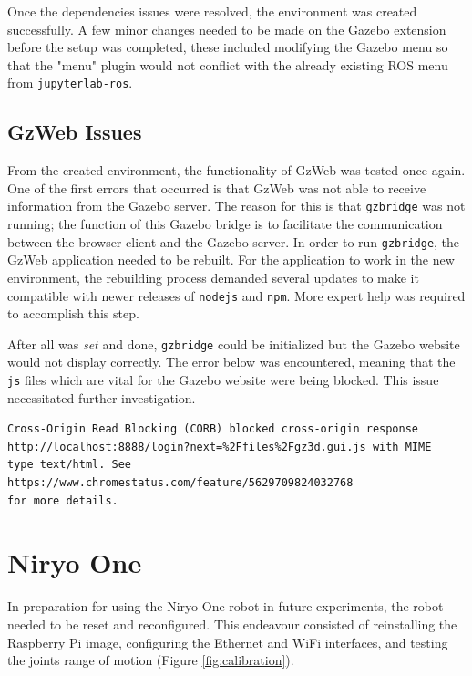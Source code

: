     Once the dependencies issues were resolved, the environment was created successfully. A few minor changes needed to be made on the Gazebo extension before the setup was completed, these included modifying the Gazebo menu so that the "menu" plugin would not conflict with the already existing ROS menu from \texttt{jupyterlab-ros}.
    
    \subsection{GzWeb Issues}
    
    From the created environment, the functionality of GzWeb was tested once again. One of the first errors that occurred is that GzWeb was not able to receive information from the Gazebo server. The reason for this is that \texttt{gzbridge} was not running; the function of this Gazebo bridge is to facilitate the communication between the browser client and the Gazebo server. In order to run \texttt{gzbridge}, the GzWeb application needed to be rebuilt. For the application to work in the new environment, the rebuilding process demanded several updates to make it compatible with newer releases of \texttt{nodejs} and \texttt{npm}. More expert help was required to accomplish this step.
    
    After all was \textit{set} and done, \texttt{gzbridge} could be initialized but the Gazebo website would not display correctly. The error below was encountered, meaning that the \texttt{js} files which are vital for the Gazebo website were being blocked. This issue necessitated further investigation.
    
    
    \begin{lstlisting}[language=Warning]
Cross-Origin Read Blocking (CORB) blocked cross-origin response
http://localhost:8888/login?next=%2Ffiles%2Fgz3d.gui.js with MIME 
type text/html. See https://www.chromestatus.com/feature/5629709824032768 
for more details.
    \end{lstlisting}
    

\section{Niryo One}

    In preparation for using the Niryo One robot in future experiments, the robot needed to be reset and reconfigured. This endeavour consisted of reinstalling the Raspberry Pi image, configuring the Ethernet and WiFi interfaces, and testing the joints range of motion (Figure \ref{fig:calibration}). 

